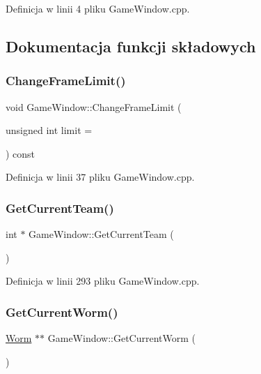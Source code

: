 Definicja w linii 4 pliku Game\+Window.\+cpp.



\subsection{Dokumentacja funkcji składowych}
\mbox{\label{class_game_window_af2b8df98b008a25d8c64f67cd6f23f59}} 
\subsubsection{\texorpdfstring{Change\+Frame\+Limit()}{ChangeFrameLimit()}}
{\footnotesize\ttfamily void Game\+Window\+::\+Change\+Frame\+Limit (\begin{DoxyParamCaption}\item[{unsigned int}]{limit = {} }\end{DoxyParamCaption}) const}



Definicja w linii 37 pliku Game\+Window.\+cpp.

\mbox{\label{class_game_window_a67485df550fda5b1cc0aa6e7644f72e8}} 
\subsubsection{\texorpdfstring{Get\+Current\+Team()}{GetCurrentTeam()}}
{\footnotesize\ttfamily int $\ast$ Game\+Window\+::\+Get\+Current\+Team (\begin{DoxyParamCaption}{ }\end{DoxyParamCaption})}



Definicja w linii 293 pliku Game\+Window.\+cpp.

\mbox{\label{class_game_window_a172c7184152f5c49a5089205ae3528f5}} 
\subsubsection{\texorpdfstring{Get\+Current\+Worm()}{GetCurrentWorm()}}
{\footnotesize\ttfamily \mbox{\hyperlink{class_worm}{Worm}} $\ast$$\ast$ Game\+Window\+::\+Get\+Current\+Worm (\begin{DoxyParamCaption}{ }\end{DoxyParamCaption})}



